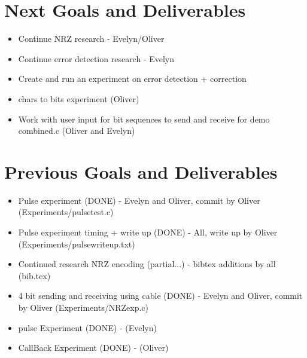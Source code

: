 \documentclass{article}
\begin{document}
\section*{Next Goals and Deliverables}
\begin{itemize}
\item Continue NRZ research - Evelyn/Oliver
\item Continue error detection research - Evelyn
\item Create and run an experiment on error detection + correction
\item chars to bits experiment (Oliver)
\item Work with user input for bit sequences to send and receive for demo combined.c (Oliver and Evelyn)
\end{itemize}
\section*{Previous Goals and Deliverables}
\begin{itemize}
\item Pulse experiment (DONE) - Evelyn and Oliver, commit by Oliver (Experiments/pulsetest.c)
\item Pulse experiment timing + write up (DONE) - All, write up by Oliver (Experiments/pulsewriteup.txt)
\item Continued research NRZ encoding (partial...) - bibtex additions by all (bib.tex)
\item 4 bit sending and receiving using cable (DONE) - Evelyn and Oliver, commit by Oliver (Experiments/NRZexp.c)
\item pulse Experiment (DONE) - (Evelyn)
\item CallBack Experiment (DONE) - (Oliver)
\end{itemize}
\end{document}
